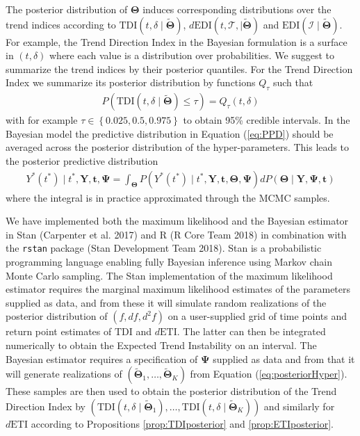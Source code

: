 \documentclass[
  11pt,
]{article}
\theoremstyle{nonumberplain}
\begin{document}
The posterior distribution of \(\bm{\Theta}\) induces corresponding
distributions over the trend indices according to
\(\mathrm{TDI}(t, \delta \mid \widetilde{\bm{\Theta}})\),
\(d\mathrm{EDI}(t, \mathcal{T}, \mid \widetilde{\bm{\Theta}})\) and
\(\mathrm{EDI}(\mathcal{I} \mid \widetilde{\bm{\Theta}})\). For example,
the Trend Direction Index in the Bayesian formulation is a surface in
\((t, \delta)\) where each value is a distribution over probabilities.
We suggest to summarize the trend indices by their posterior quantiles.
For the Trend Direction Index we summarize its posterior distribution by
functions \(Q_\tau\) such that \begin{align*}
  P\left(\mathrm{TDI}\left(t, \delta \mid \widetilde{\bm{\Theta}}\right) \leq \tau\right) = Q_\tau(t, \delta)
\end{align*} with for example
\(\tau \in \left\{0.025, 0.5, 0.975\right\}\) to obtain 95\% credible
intervals. In the Bayesian model the predictive distribution in Equation
(\ref{eq:PPD}) should be averaged across the posterior distribution of
the hyper-parameters. This leads to the posterior predictive
distribution \begin{align*}
Y^\ast(t^\ast) \mid t^\ast, \mathbf{Y}, \mathbf{t}, \bm{\Psi} = \int_{\bm{\Theta}} P(Y^\ast(t^\ast) \mid t^\ast, \mathbf{Y}, \mathbf{t}, \bm{\Theta}, \bm{\Psi})dP(\bm{\Theta} \mid \mathbf{Y}, \bm{\Psi}, \mathbf{t})
\end{align*} where the integral is in practice approximated through the
MCMC samples.

We have implemented both the maximum likelihood and the Bayesian
estimator in Stan (Carpenter et al. 2017) and R (R Core Team 2018) in
combination with the \texttt{rstan} package (Stan Development Team
2018). Stan is a probabilistic programming language enabling fully
Bayesian inference using Markov chain Monte Carlo sampling. The Stan
implementation of the maximum likelihood estimator requires the marginal
maximum likelihood estimates of the parameters supplied as data, and
from these it will simulate random realizations of the posterior
distribution of \((f, df, d^2\!f)\) on a user-supplied grid of time
points and return point estimates of \(\mathrm{TDI}\) and
\(d\mathrm{ETI}\). The latter can then be integrated numerically to
obtain the Expected Trend Instability on an interval. The Bayesian
estimator requires a specification of \(\bm{\Psi}\) supplied as data and
from that it will generate realizations of
\((\widetilde{\bm{\Theta}}_1, \ldots, \widetilde{\bm{\Theta}}_K)\) from
Equation (\ref{eq:posteriorHyper}). These samples are then used to
obtain the posterior distribution of the Trend Direction Index by
\((\mathrm{TDI}(t, \delta \mid \widetilde{\bm{\Theta}}_1), \ldots, \mathrm{TDI}(t, \delta \mid \widetilde{\bm{\Theta}}_K))\)
and similarly for \(d\mathrm{ETI}\) according to Propositions
\ref{prop:TDIposterior} and \ref{prop:ETIposterior}.
\end{document}
